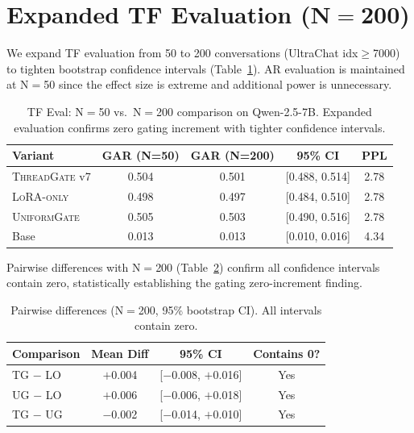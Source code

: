 \documentclass[11pt]{article}
\newcommand{\gar}{\textsc{GAR}}
\newcommand{\tg}{\textsc{ThreadGate}}
\newcommand{\ug}{\textsc{UniformGate}}
\newcommand{\lo}{\textsc{LoRA-only}}
\begin{document}
\appendix

\section{Expanded TF Evaluation (N$=$200)}
\label{app:expanded_eval}

We expand TF evaluation from 50 to 200 conversations (UltraChat idx$\geq$7000) to tighten bootstrap confidence intervals (Table~\ref{tab:expanded_eval}). AR evaluation is maintained at N$=$50 since the effect size is extreme and additional power is unnecessary.

\begin{table}[h]
\centering
\small
\caption{TF Eval: N$=$50 vs.\ N$=$200 comparison on Qwen-2.5-7B. Expanded evaluation confirms zero gating increment with tighter confidence intervals.}
\label{tab:expanded_eval}
\begin{tabular}{lcccc}
\toprule
\textbf{Variant} & \textbf{\gar{} (N=50)} & \textbf{\gar{} (N=200)} & \textbf{95\% CI} & \textbf{PPL} \\
\midrule
\tg{} v7 & 0.504 & 0.501 & [0.488, 0.514] & 2.78 \\
\lo{} & 0.498 & 0.497 & [0.484, 0.510] & 2.78 \\
\ug{} & 0.505 & 0.503 & [0.490, 0.516] & 2.78 \\
Base & 0.013 & 0.013 & [0.010, 0.016] & 4.34 \\
\bottomrule
\end{tabular}
\end{table}

Pairwise differences with N$=$200 (Table~\ref{tab:pairwise_n200}) confirm all confidence intervals contain zero, statistically establishing the gating zero-increment finding.

\begin{table}[h]
\centering
\small
\caption{Pairwise differences (N$=$200, 95\% bootstrap CI). All intervals contain zero.}
\label{tab:pairwise_n200}
\begin{tabular}{lccc}
\toprule
\textbf{Comparison} & \textbf{Mean Diff} & \textbf{95\% CI} & \textbf{Contains 0?} \\
\midrule
TG $-$ LO & $+$0.004 & [$-$0.008, $+$0.016] & Yes \\
UG $-$ LO & $+$0.006 & [$-$0.006, $+$0.018] & Yes \\
TG $-$ UG & $-$0.002 & [$-$0.014, $+$0.010] & Yes \\
\bottomrule
\end{tabular}
\end{table}
\end{document}
